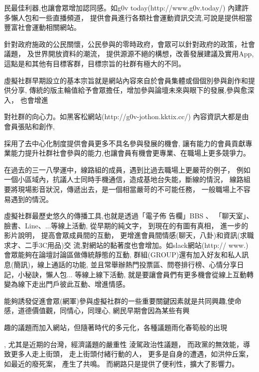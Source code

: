 民最佳利器,也讓會眾增加認同感。如g0v today(http://www.g0v.today/) 內建許多懶人包和一些直播頻道， 
提供會員進行各類社會運動資訊交流,可說是提供相當豐富社會運動相關網站。

針對政府施政的公民關懷，公民參與的零時政府，會眾可以針對政府的政策，社會議題，
及世界開放資料的潮流，
提供源源不絕的構想，改善發展建議及實用App,這點是和其他有目標客群，目標宗旨的社群有極大的不同。


虛擬社群早期設立的基本宗旨就是網站內容來自於會員集體或個個別參與創作和提供分享,
傳統的版主輪值給予會眾擔任，增加參與論壇未來與眼下的發展,參與愈深入，
也會增進

對社群的向心力。如黑客松網站(http://g0v-jothon.kktix.cc/) 內容資訊大都是由會員張貼和創作, 

採用了去中心化制度提供會員更多不具名參與發展的機會, 
讓有能力的會員貢獻專業能力提升社群社會參與的能力,也讓會員有機會更專業、在職場上更多競爭力。

在過去的三一八學運中，線路組的成員，遇到比過去職場上更嚴苛的例子，
例如一個小區域內，抗議人士同時手機通信，造成基地台失能，斷線的情況，
線路組要將現場影音狀況，傳遞出去，是一個相當嚴苛的不可能任務，
一般職場上不容易遇到的情況。




虛擬社群最歷史悠久的傳播工具,也就是透過「電子佈
告欄」BBS
、
「聊天室」、臉書、Line、...等線上活動,
從早期的純文字，
到現在的有圖有真相，
進一步的影片說明，
提高會眾成員間的互動，
更增進會員間情感(聊天，八卦)和資訊(求職求才、二手3C用品)交
流,對網站的黏著度也會增加。如slack網站(http://
www.) 會眾能夠在論壇討論區做傳統靜態的互動, 群組(GROUP)還有加入好友和私人訊息(簡訊)，線上通話的功能, 
並且常舉辦熱門投票區、問卷排行榜、心情分享日記，小秘訣，懶人包... 等線上線下活動, 
就是要讓會員們有更多機會從線上互動轉變為線下走出門戶彼此互動、增進情感。






能夠誘發促進會眾(網軍)參與虛擬社群的一些重要關鍵因素就是共同興趣,使命感，道德價值觀，同情心，同理心,
網民早期會因為某些有興

趣的議題而加入網站，但隨著時代的多元化，各種議題雨化春筍般的出現

,
尤其是近期的台灣，經濟議題的嚴重性
淩駕政治性議題，
而政黨的無效能，導致更多人走上街頭，
走上街頭付緒行動的人，
更多是自身的遭遇，如洪仲丘案，如最近的廢死案，
產生了共鳴。
而網路只是提供了便利性，擴大了影響力。






